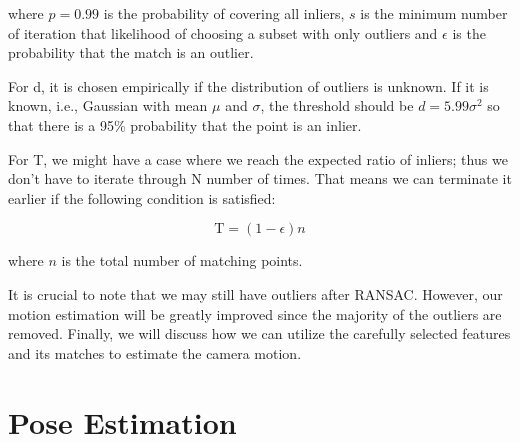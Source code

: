 \documentclass[a4paper]{report}
\numberwithin{figure}{section}
\begin{document}
where $p=0.99$ is the probability of covering all inliers, $s$ is the minimum 
number of iteration that likelihood of choosing a subset with only outliers 
and $\epsilon$ is the probability that the match is an outlier.

For d, it is chosen empirically if the distribution of outliers is unknown. If 
it is known, i.e., Gaussian with mean $\mu$ and $\sigma$, the threshold should 
be $d=5.99\sigma^2$ so that there is a 95\% probability that the point is an 
inlier.

For T, we might have a case where we reach the expected ratio of inliers; thus 
we don't have to iterate through N number of times. That means we can 
terminate it earlier if the following condition is satisfied:

\begin{equation}
  \text{T} = (1-\epsilon)n
\end{equation}

where $n$ is the total number of matching points.

It is crucial to note that we may still have outliers after RANSAC.  However, 
our motion estimation will be greatly improved since the majority of the 
outliers are removed.  Finally, we will discuss how we can utilize the 
carefully selected features and its matches to estimate the camera motion.


\section{Pose Estimation} \label{sc_pose_estimation}
\end{document}
